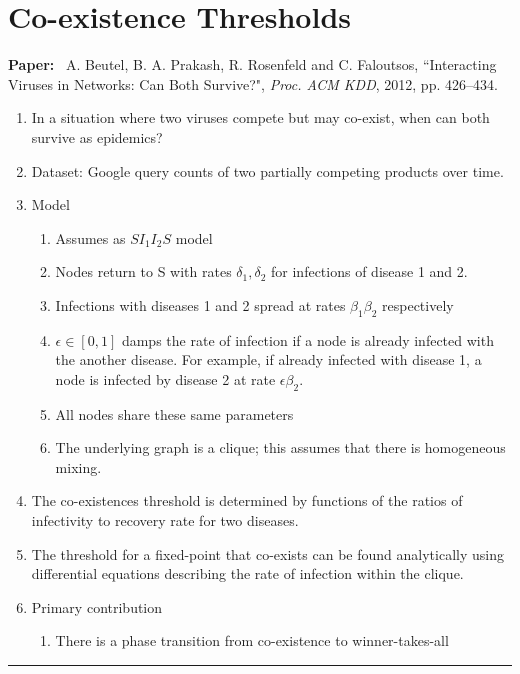 \documentclass[11pt]{article}
\begin{document}
\clearpage


\section{Co-existence Thresholds}

\noindent
\textbf{Paper:}~  
A. Beutel, B. A. Prakash, R. Rosenfeld and C. Faloutsos,
``Interacting Viruses in Networks: Can Both Survive?",
\emph{Proc. ACM KDD}, 2012, pp. 426--434.

\begin{enumerate}
    
    \item In a situation where two viruses compete but may co-exist, when can both survive as epidemics?
    
    \item Dataset: Google query counts of two partially competing products over time.
    
    \item Model \begin{enumerate}
        \item Assumes as $SI_{1}I_{2}S$ model
        
        \item Nodes return to S with rates $\delta_{1},\delta_{2}$ for infections of disease 1 and 2.
        
        \item Infections with diseases 1 and 2 spread at rates $\beta_{1}\beta_{2}$ respectively
        
        \item $\epsilon \in [0,1]$ damps the rate of infection if a node is already infected with the another disease. For example, if already infected with disease 1, a node is infected by disease 2 at rate $\epsilon\beta_{2}$.
        
        \item All nodes share these same parameters
        
        \item The underlying graph is a clique; this assumes 
        that there is homogeneous mixing. 
         
        
    \end{enumerate}
    
    \item The co-existences threshold is determined by functions of the ratios of infectivity to recovery rate for two diseases.
    
    
    \item The threshold for a fixed-point that co-exists can be 
    found analytically using differential equations describing the rate of infection within the clique.
    
    \item Primary contribution \begin{enumerate}
        \item There is a phase transition from co-existence to winner-takes-all
    \end{enumerate}
    
\end{enumerate}
\noindent
\rule{\textwidth}{0.01in}
\end{document}
